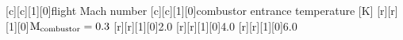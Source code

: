    [c][c][1][0]{flight Mach number}
   [c][c][1][0]{combustor entrance temperature [K]}
   [r][r][1][0]{${\rm M}_{\rm combustor}=0.3$}
   [r][r][1][0]{2.0}
   [r][r][1][0]{4.0}
   [r][r][1][0]{6.0}

